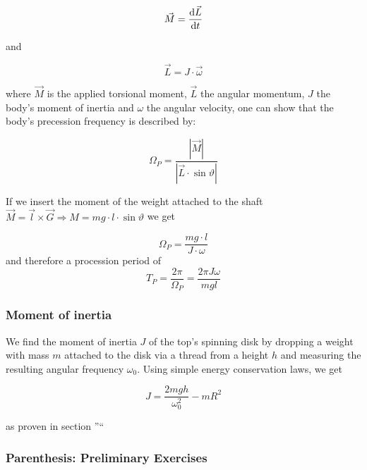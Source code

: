 \documentclass{scrreprt}
\begin{document}
\begin{equation}
\vec{M} = \frac{\dif \vec{L}}{\dif t}
\end{equation}

and

\begin{equation}
\vec{L} = J \cdot \vec{\omega}
\end{equation}

where $\vec{M}$ is the applied torsional moment, $\vec{L}$ the angular momentum, $J$ the body's moment of inertia and $\omega$ the angular velocity, one can show that the body's precession frequency is described by:

\begin{equation}
\Omega_P = \frac{|\vec{M}|}{|\vec{L}\cdot \sin \vartheta|}
\end{equation}

If we insert the moment of the weight attached to the shaft $\vec{M} = \vec{l} \times \vec{G} \Rightarrow M = m g \cdot l \cdot \sin \vartheta$ we get

\begin{equation}
\Omega_P = \frac{mg\cdot l}{J\cdot \omega}
\end{equation}
and therefore a procession period of
\begin{equation}
T_P = \frac{2\pi}{\Omega_P} = \frac{2\pi J \omega}{mgl}
\end{equation}

\subsubsection{Moment of inertia}

We find the moment of inertia $J$ of the top's spinning disk by dropping a weight with mass $m$ attached to the disk via a thread from a height $h$ and measuring the resulting angular frequency $\omega_0$. Using simple energy conservation laws, we get

\begin{equation}
\label{eq:inertia}
J = \frac{2mgh}{\omega_0^2} - m R^2
\end{equation}

as proven in section ''``

\subsubsection{Parenthesis: Preliminary Exercises}
\label{sec:preliminary_exercises}
\end{document}
